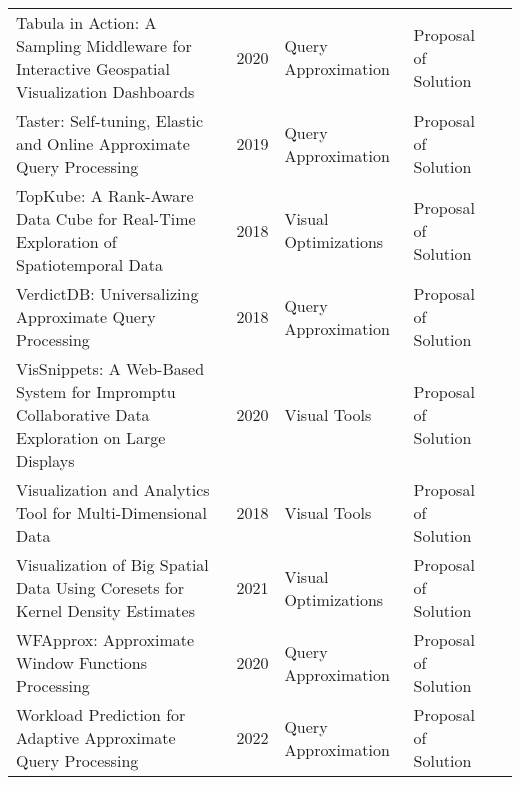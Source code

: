 \begin{longtable}{p{18em} l l l l}
Tabula in Action: {{A}} Sampling Middleware for Interactive Geospatial Visualization Dashboards & 2020 & Query Approximation & Proposal of Solution & \cite{yu_tabula_2020}\\ 
Taster: {{Self-tuning}}, Elastic and Online Approximate Query Processing & 2019 & Query Approximation & Proposal of Solution & \cite{olma_taster_2019}\\ 
{{TopKube}}: {{A}} Rank-Aware Data Cube for Real-Time Exploration of Spatiotemporal Data & 2018 & Visual Optimizations & Proposal of Solution & \cite{miranda_topkube_2018}\\ 
{{VerdictDB}}: {{Universalizing}} Approximate Query Processing & 2018 & Query Approximation & Proposal of Solution & \cite{park_verdictdb_2018}\\ 
{{VisSnippets}}: {{A}} Web-Based System for Impromptu Collaborative Data Exploration on Large Displays & 2020 & Visual Tools & Proposal of Solution & \cite{burks_vissnippets_2020}\\ 
Visualization and Analytics Tool for Multi-Dimensional Data & 2018 & Visual Tools & Proposal of Solution & \cite{jesenko_visualization_2018}\\ 
Visualization of Big Spatial Data Using Coresets for Kernel Density Estimates & 2021 & Visual Optimizations & Proposal of Solution & \cite{zheng_visualization_2021}\\ 
{{WFApprox}}: {{Approximate Window Functions Processing}} & 2020 & Query Approximation & Proposal of Solution & \cite{lin_wfapprox_2020}\\ 
Workload Prediction for Adaptive Approximate Query Processing & 2022 & Query Approximation & Proposal of Solution & \cite{shahrivari_workload_2022}\\ 
\end{longtable}

\restoregeometry
\printbibliography
